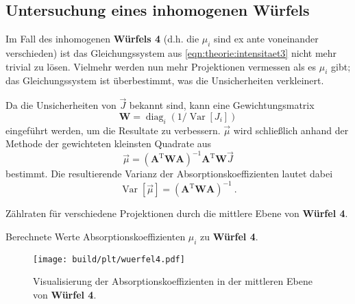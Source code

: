 \subsection{Untersuchung eines inhomogenen Würfels} \label{sec:auswertung:wuerfel4}
Im Fall des inhomogenen \textbf{Würfels 4}
(d.h. die $\mu_i$ sind ex ante voneinander verschieden)
ist das Gleichungssystem aus \ref{eqn:theorie:intensitaet3} nicht mehr trivial zu lösen.
Vielmehr werden nun mehr Projektionen vermessen als es $\mu_i$ gibt;
das Gleichungssystem ist überbestimmt,
was die Unsicherheiten verkleinert.

\def\A{\symbf{A}}
\def\W{\symbf{W}}
\def\T{\mathrm{T}}

Da die Unsicherheiten von $\vec{J}$ bekannt sind,
kann eine Gewichtungsmatrix
\[ \symbf{W} = \operatorname{diag}_i (1 / \operatorname{Var}[J_i]) \]
eingeführt werden,
um die Resultate zu verbessern.
$\vec{\mu}$ wird schließlich anhand der Methode der gewichteten kleinsten Quadrate aus
\begin{equation*}
    \vec{\mu} = (\A^\T \W \A)^{-1} \A^\T \W \vec{J}
\end{equation*}
bestimmt.
Die resultierende Varianz der Absorptionskoeffizienten lautet dabei
\begin{equation*}
    \operatorname{Var}[\vec{\mu}] = (\A^\T \W \A)^{-1} \ .
\end{equation*}



\begin{table}[H]
    \centering
    \caption{Zählraten für verschiedene Projektionen durch die mittlere Ebene von \textbf{Würfel 4}.}
    \label{tab:auswertung:wuerfel4}
\end{table}

\begin{table}[H]
    \centering
    \caption{Berechnete Werte Absorptionskoeffizienten $\mu_i$ zu \textbf{Würfel 4}.}
    \label{tab:auswertung:wuerfel4_mu}
\end{table}

\begin{figure}
    \centering
    \texttt{[image: build/plt/wuerfel4.pdf]}
    \caption{Visualisierung der Absorptionskoeffizienten in der mittleren Ebene von \textbf{Würfel 4}.}
    \label{plt:auswertung:wuerfel4}
\end{figure}
